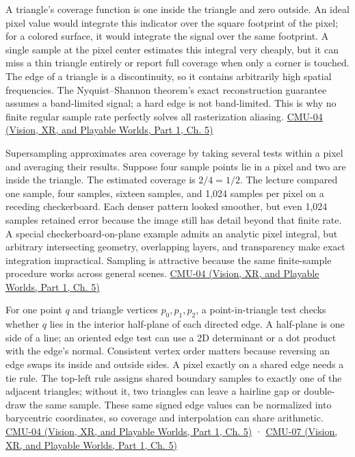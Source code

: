 \hypertarget{03-visual-computing-i-ch015-coverage-samples-and-a-triangle-rasterizer}{}

A triangle's coverage function is one inside the triangle and zero outside. An ideal pixel value would integrate this indicator over the square footprint of the pixel; for a colored surface, it would integrate the signal over the same footprint. A single sample at the pixel center estimates this integral very cheaply, but it can miss a thin triangle entirely or report full coverage when only a corner is touched. The edge of a triangle is a discontinuity, so it contains arbitrarily high spatial frequencies. The Nyquist--Shannon theorem's exact reconstruction guarantee assumes a band-limited signal; a hard edge is not band-limited. This is why no finite regular sample rate perfectly solves all rasterization aliasing. \href{../07-Vision-XR-and-Playable-Worlds-P01/main.pdf\#nameddest=04-visual-computing-ii-ch036-cmu-04---drawing-a-triangle-and-an-intro-to-sampling}{CMU-04 (Vision, XR, and Playable Worlds, Part 1, Ch. 5)}

Supersampling approximates area coverage by taking several tests within a pixel and averaging their results. Suppose four sample points lie in a pixel and two are inside the triangle. The estimated coverage is \(2/4=1/2\). The lecture compared one sample, four samples, sixteen samples, and 1,024 samples per pixel on a receding checkerboard. Each denser pattern looked smoother, but even 1,024 samples retained error because the image still has detail beyond that finite rate. A special checkerboard-on-plane example admits an analytic pixel integral, but arbitrary intersecting geometry, overlapping layers, and transparency make exact integration impractical. Sampling is attractive because the same finite-sample procedure works across general scenes. \href{../07-Vision-XR-and-Playable-Worlds-P01/main.pdf\#nameddest=04-visual-computing-ii-ch036-cmu-04---drawing-a-triangle-and-an-intro-to-sampling}{CMU-04 (Vision, XR, and Playable Worlds, Part 1, Ch. 5)}

For one point \(q\) and triangle vertices \(p_0,p_1,p_2\), a point-in-triangle test checks whether \(q\) lies in the interior half-plane of each directed edge. A half-plane is one side of a line; an oriented edge test can use a 2D determinant or a dot product with the edge's normal. Consistent vertex order matters because reversing an edge swaps its inside and outside sides. A pixel exactly on a shared edge needs a tie rule. The top-left rule assigns shared boundary samples to exactly one of the adjacent triangles; without it, two triangles can leave a hairline gap or double-draw the same sample. These same signed edge values can be normalized into barycentric coordinates, so coverage and interpolation can share arithmetic. \href{../07-Vision-XR-and-Playable-Worlds-P01/main.pdf\#nameddest=04-visual-computing-ii-ch036-cmu-04---drawing-a-triangle-and-an-intro-to-sampling}{CMU-04 (Vision, XR, and Playable Worlds, Part 1, Ch. 5)} · \href{../07-Vision-XR-and-Playable-Worlds-P01/main.pdf\#nameddest=04-visual-computing-ii-ch036-cmu-07---perspective-projection-and-texture-mapping}{CMU-07 (Vision, XR, and Playable Worlds, Part 1, Ch. 5)}

